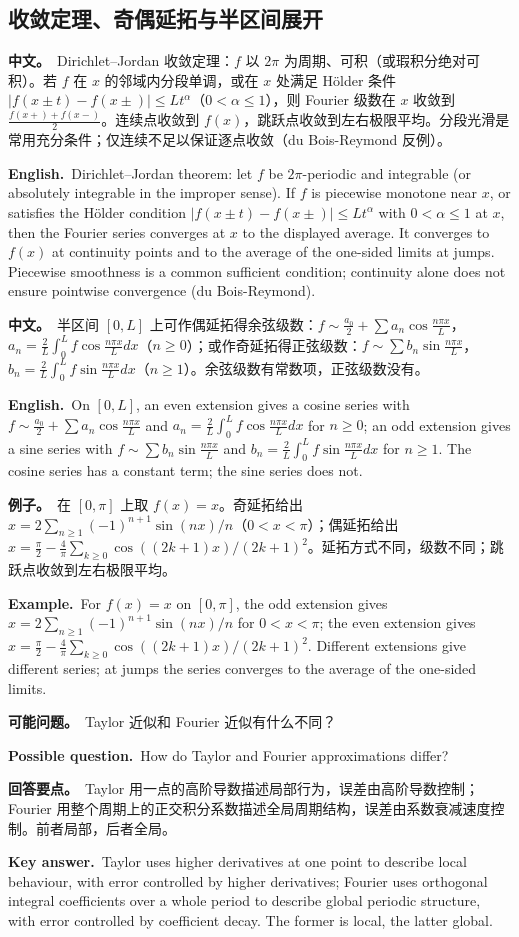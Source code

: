 \documentclass[UTF8,11pt,a4paper]{ctexart}
\newcommand{\BOTH}[2]{\par\noindent\textbf{中文。}\ #1\par\noindent\textbf{English.}\ #2\par}
\newcommand{\EX}[2]{\par\noindent\textbf{例子。}\ #1\par\noindent\textbf{Example.}\ #2\par}
\newcommand{\ASK}[4]{\begin{samepage}\par\noindent\textbf{可能问题。}\ #1\par\noindent\textbf{Possible question.}\ #2\par\noindent\textbf{回答要点。}\ #3\par\noindent\textbf{Key answer.}\ #4\medskip\end{samepage}}
\begin{document}
\subsection{收敛定理、奇偶延拓与半区间展开}
\BOTH{Dirichlet--Jordan 收敛定理：$f$ 以 $2\pi$ 为周期、可积（或瑕积分绝对可积）。若 $f$ 在 $x$ 的邻域内分段单调，或在 $x$ 处满足 Hölder 条件 $|f(x\pm t)-f(x\pm)|\le Lt^\alpha$（$0<\alpha\le1$），则 Fourier 级数在 $x$ 收敛到 $\frac{f(x+)+f(x-)}{2}$。连续点收敛到 $f(x)$，跳跃点收敛到左右极限平均。分段光滑是常用充分条件；仅连续不足以保证逐点收敛（du Bois-Reymond 反例）。}{Dirichlet--Jordan theorem: let $f$ be $2\pi$-periodic and integrable (or absolutely integrable in the improper sense). If $f$ is piecewise monotone near $x$, or satisfies the Hölder condition $|f(x\pm t)-f(x\pm)|\le Lt^\alpha$ with $0<\alpha\le1$ at $x$, then the Fourier series converges at $x$ to the displayed average. It converges to $f(x)$ at continuity points and to the average of the one-sided limits at jumps. Piecewise smoothness is a common sufficient condition; continuity alone does not ensure pointwise convergence (du Bois-Reymond).}
\BOTH{半区间 $[0,L]$ 上可作偶延拓得余弦级数：$f\sim\frac{a_0}{2}+\sum a_n\cos\frac{n\pi x}{L}$，$a_n=\frac2L\int_0^Lf\cos\frac{n\pi x}{L}dx$（$n\ge0$）；或作奇延拓得正弦级数：$f\sim\sum b_n\sin\frac{n\pi x}{L}$，$b_n=\frac2L\int_0^Lf\sin\frac{n\pi x}{L}dx$（$n\ge1$）。余弦级数有常数项，正弦级数没有。}{On $[0,L]$, an even extension gives a cosine series with $f\sim\frac{a_0}{2}+\sum a_n\cos\frac{n\pi x}{L}$ and $a_n=\frac2L\int_0^Lf\cos\frac{n\pi x}{L}dx$ for $n\ge0$; an odd extension gives a sine series with $f\sim\sum b_n\sin\frac{n\pi x}{L}$ and $b_n=\frac2L\int_0^Lf\sin\frac{n\pi x}{L}dx$ for $n\ge1$. The cosine series has a constant term; the sine series does not.}
\EX{在 $[0,\pi]$ 上取 $f(x)=x$。奇延拓给出 $x=2\sum_{n\ge1}(-1)^{n+1}\sin(nx)/n$（$0<x<\pi$）；偶延拓给出 $x=\frac\pi2-\frac4\pi\sum_{k\ge0}\cos((2k+1)x)/(2k+1)^2$。延拓方式不同，级数不同；跳跃点收敛到左右极限平均。}{For $f(x)=x$ on $[0,\pi]$, the odd extension gives $x=2\sum_{n\ge1}(-1)^{n+1}\sin(nx)/n$ for $0<x<\pi$; the even extension gives $x=\frac\pi2-\frac4\pi\sum_{k\ge0}\cos((2k+1)x)/(2k+1)^2$. Different extensions give different series; at jumps the series converges to the average of the one-sided limits.}
\ASK{Taylor 近似和 Fourier 近似有什么不同？}{How do Taylor and Fourier approximations differ?}{Taylor 用一点的高阶导数描述局部行为，误差由高阶导数控制；Fourier 用整个周期上的正交积分系数描述全局周期结构，误差由系数衰减速度控制。前者局部，后者全局。}{Taylor uses higher derivatives at one point to describe local behaviour, with error controlled by higher derivatives; Fourier uses orthogonal integral coefficients over a whole period to describe global periodic structure, with error controlled by coefficient decay. The former is local, the latter global.}
\end{document}
